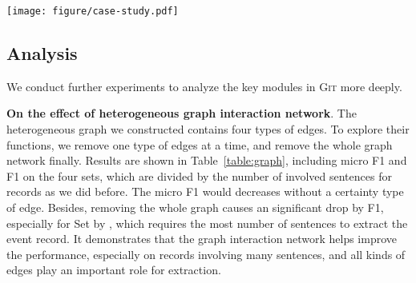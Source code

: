 \documentclass[11pt,a4paper]{article}
\newcommand{\modelname}{\textsc{Git}\xspace}
\begin{document}
\begin{figure*}[t]
    \centering
    \texttt{[image: figure/case-study.pdf]}
    \caption{The case study of our proposed \modelname and Doc2EDAG, with their key prediction difference colored in red.
    Related entities are colored in blue.
    \modelname successfully extract \textit{TotalHoldingShares} and \textit{TotalPledgedShares} for Record , while Doc2EDAG fails.
    The complete content are provided in Appendix~\ref{appendix-case-study}. }
    \label{fig:case-study}
\end{figure*}

\subsection{Analysis}
\label{sec:analysis}
We conduct further experiments to analyze the  key modules in \modelname more deeply. 

\textbf{On the effect of heterogeneous graph interaction network}. 
The heterogeneous graph we constructed contains four types of edges.
To explore their functions, we remove one type of edges at a time, and remove the whole graph network finally.
Results are shown in Table~\ref{table:graph}, including micro F1 and F1 on the four sets, which are divided by the number of involved sentences for records as we did before.
The micro F1 would decreases  without a certainty type of edge.
Besides, removing the whole graph causes an significant drop by  F1, especially for Set \uppercase\expandafter{} by , which requires the most number of sentences to extract the event record.
It demonstrates that the graph interaction network helps improve the performance, especially on records involving many sentences, and all kinds of edges play an important role for extraction.
\end{document}
